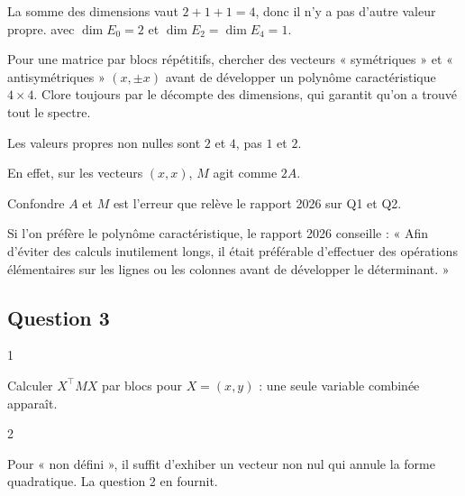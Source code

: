 \documentclass[11pt,a4paper]{article}
\newcommand{\equationajustee}[1]{%
  \sbox{\boiteequation}{$\displaystyle #1$}%
  \ifdim\wd\boiteequation>\linewidth
    \[\resizebox{\linewidth}{!}{\usebox{\boiteequation}}\]%
  \else
    \[#1\]%
  \fi}
\begin{document}
La somme des dimensions vaut \(2+1+1=4\), donc il n'y a pas d'autre valeur propre.
\equationajustee{\boxed{\mathrm{Sp}(M)=\{0,2,4\}}}
avec \(\dim E_0=2\) et \(\dim E_2=\dim E_4=1\).

\begin{methode}

Pour une matrice par blocs répétitifs, chercher des vecteurs « symétriques » et « antisymétriques » \((x,\pm x)\) avant de développer un polynôme caractéristique \(4\times4\). Clore toujours par le décompte des dimensions, qui garantit qu'on a trouvé tout le spectre.

\end{methode}

\begin{piege}

Les valeurs propres non nulles sont \(2\) et \(4\), pas \(1\) et \(2\).

En effet, sur les vecteurs \((x,x)\), \(M\) agit comme \(2A\).

Confondre \(A\) et \(M\) est l'erreur que relève le rapport 2026 sur Q1 et Q2.

\end{piege}

\begin{jury}

Si l'on préfère le polynôme caractéristique, le rapport 2026 conseille : « Afin d'éviter des calculs inutilement longs, il était préférable d'effectuer des opérations élémentaires sur les lignes ou les colonnes avant de développer le déterminant. »

\end{jury}

\hypertarget{question-3}{%
\subsection{Question 3}\label{question-3}}

\begin{indication}{1}

Calculer \(X^\top MX\) par blocs pour \(X=(x,y)\) : une seule variable combinée apparaît.

\end{indication}

\begin{indication}{2}

Pour « non défini », il suffit d'exhiber un vecteur non nul qui annule la forme quadratique. La question 2 en fournit.

\end{indication}
\end{document}
